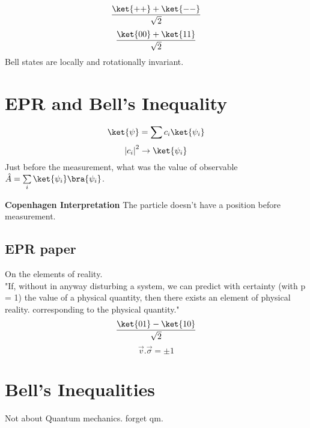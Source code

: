 
\[
    \frac{\ket{++}+\ket{--}}{\sqrt{2} }
\]
\[
    \frac{\ket{00}+\ket{11}}{\sqrt{2}}
\]
Bell states are locally and rotationally invariant.
\section{EPR and Bell's Inequality}
\[
    \ket{\psi} = \sum c_i\ket{\psi_i}
\]
\[
    \left\vert c_i \right\vert ^2 \to \ket{\psi_{i} }
\]
Just before the measurement, what was the value of observable \(\hat{A} = \sum\limits_{i} \ket{\psi_i}\bra{\psi_i} \).
\begin{answer}
    \textbf{Copenhagen Interpretation}
    The particle doesn't have a position before measurement.   
\end{answer}
\subsection{EPR paper}
On the elements of reality.\\
"If, without in anyway disturbing a system, we can predict with certainty (with p = 1) the value of a physical quantity, then there exists an element of physical reality.
corresponding to the physical quantity."
\[
    \frac{\ket{01}-\ket{10}}{\sqrt{2} }
\]
\[
    \vec{v}.\vec{\sigma} = \pm 1
\]
\section{Bell's Inequalities}
Not about Quantum mechanics. forget qm. 